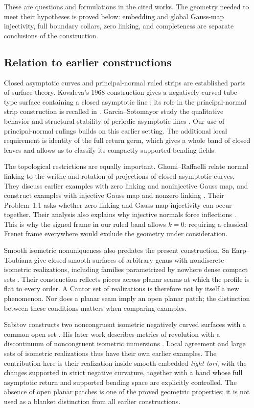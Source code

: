 \documentclass[11pt]{amsart}
\theoremstyle{definition}
\theoremstyle{remark}
\numberwithin{equation}{section}
\begin{document}
These are questions and formulations in the cited works. The geometry
needed to meet their hypotheses is proved below: embedding and global
Gauss-map injectivity, full boundary collars, zero linking, and
completeness are separate conclusions of the construction.

\subsection{Relation to earlier constructions}
Closed asymptotic curves and principal-normal ruled strips are established
parts of surface theory. Kovaleva's 1968 construction gives a negatively
curved tube-type surface containing a closed asymptotic line
\cite{Kovaleva}; its role in the principal-normal strip construction
is recalled in \cite[Note~2.1]{GR}. Garcia--Sotomayor study the qualitative behavior and
structural stability of periodic asymptotic lines
\cite{GarciaSotomayor}. Our use of principal-normal rulings builds on
this earlier setting. The additional local requirement is identity of
the full return germ, which gives a whole band of closed leaves and
allows us to classify its compactly supported bending fields.

The topological restrictions are equally important. Ghomi--Raffaelli
relate normal linking to the writhe and rotation of projections of
closed asymptotic curves. They discuss earlier examples with zero
linking and noninjective Gauss map, and construct examples with
injective Gauss map and nonzero linking \cite[\S\S1,4]{GR}.
Their Problem~1.1 asks whether zero linking and Gauss-map injectivity
can occur together. Their analysis also explains why injective normals
force inflections \cite[Note~5.1]{GR}. This is why the signed frame in
our ruled band allows $k=0$: requiring a classical Frenet frame
everywhere would exclude the geometry under consideration.

Smooth isometric nonuniqueness also predates the present construction.
Sa Earp--Toubiana give closed smooth surfaces of arbitrary genus with
nondiscrete isometric realizations, including families parametrized by
nowhere dense compact sets \cite[Theorem~2]{SaEarpToubiana}. Their
construction reflects pieces across planar seams at which the profile
is flat to every order. A Cantor set of realizations is therefore not
by itself a new phenomenon. Nor does a planar seam imply an open
planar patch; the distinction between these conditions matters when
comparing examples.

Sabitov constructs two noncongruent isometric negatively curved
surfaces with a common open set \cite{Sabitov2018}. His later work
describes metrics of revolution with a discontinuum of noncongruent
isometric immersions \cite{Sabitov2021}. Local agreement and large
sets of isometric realizations thus have their own earlier examples.
The contribution here is their realization inside smooth embedded
\emph{tight tori}, with the changes supported in strict negative
curvature, together with a band whose full asymptotic return and
supported bending space are explicitly controlled. The absence of
open planar patches is one of the proved geometric properties;
it is not used as a blanket distinction from all earlier constructions.
\end{document}
